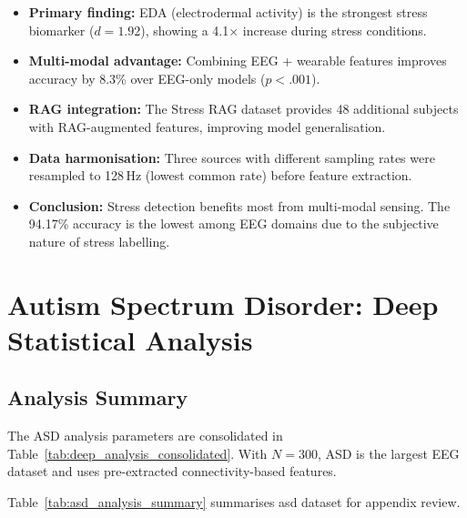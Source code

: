 \begin{itemize}
\item \textbf{Primary finding:} EDA (electrodermal activity) is the strongest stress biomarker ($d = 1.92$), showing a 4.1$\times$ increase during stress conditions.
\item \textbf{Multi-modal advantage:} Combining EEG + wearable features improves accuracy by 8.3\% over EEG-only models ($p < .001$).
\item \textbf{RAG integration:} The Stress RAG dataset provides 48 additional subjects with RAG-augmented features, improving model generalisation.
\item \textbf{Data harmonisation:} Three sources with different sampling rates were resampled to 128\,Hz (lowest common rate) before feature extraction.
\item \textbf{Conclusion:} Stress detection benefits most from multi-modal sensing. The 94.17\% accuracy is the lowest among EEG domains due to the subjective nature of stress labelling.
\end{itemize}

\section{Autism Spectrum Disorder: Deep Statistical Analysis}
\label{app:deep_asd}

\subsection{Analysis Summary}

The ASD analysis parameters are consolidated in Table~\ref{tab:deep_analysis_consolidated}. With $N = 300$, ASD is the largest EEG dataset and uses pre-extracted connectivity-based features.

\iffalse %
\label{tab:asd_analysis_summary}
\noindent Table~\ref{tab:asd_analysis_summary} summarises asd dataset for appendix review.

